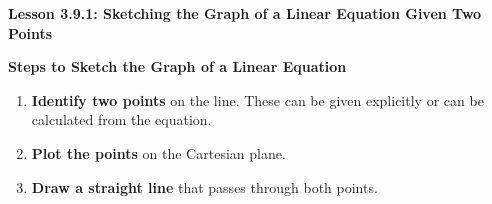  \begin{center}
\textbf{Lesson 3.9.1: Sketching the Graph of a Linear Equation Given Two Points}
\end{center}

\vspace*{1ex}

\noindent\textbf{Steps to Sketch the Graph of a Linear Equation}

\begin{enumerate}
    \item \textbf{Identify two points} on the line. These can be given explicitly or can be calculated from the equation.
    \item \textbf{Plot the points} on the Cartesian plane.
    \item \textbf{Draw a straight line} that passes through both points.
\end{enumerate}




